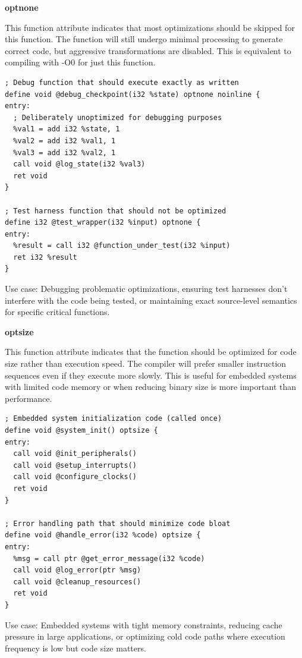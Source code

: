 \textbf{optnone}

This function attribute indicates that most optimizations should be skipped for this function.
The function will still undergo minimal processing to generate correct code, but aggressive transformations are disabled.
This is equivalent to compiling with -O0 for just this function.

\begin{lstlisting}[style=ir]
; Debug function that should execute exactly as written
define void @debug_checkpoint(i32 %state) optnone noinline {
entry:
  ; Deliberately unoptimized for debugging purposes
  %val1 = add i32 %state, 1
  %val2 = add i32 %val1, 1
  %val3 = add i32 %val2, 1
  call void @log_state(i32 %val3)
  ret void
}

; Test harness function that should not be optimized
define i32 @test_wrapper(i32 %input) optnone {
entry:
  %result = call i32 @function_under_test(i32 %input)
  ret i32 %result
}
\end{lstlisting}

Use case: Debugging problematic optimizations, ensuring test harnesses don't interfere with the code being tested, or maintaining exact source-level semantics for specific critical functions.

\textbf{optsize}

This function attribute indicates that the function should be optimized for code size rather than execution speed.
The compiler will prefer smaller instruction sequences even if they execute more slowly.
This is useful for embedded systems with limited code memory or when reducing binary size is more important than performance.

\begin{lstlisting}[style=ir]
; Embedded system initialization code (called once)
define void @system_init() optsize {
entry:
  call void @init_peripherals()
  call void @setup_interrupts()
  call void @configure_clocks()
  ret void
}

; Error handling path that should minimize code bloat
define void @handle_error(i32 %code) optsize {
entry:
  %msg = call ptr @get_error_message(i32 %code)
  call void @log_error(ptr %msg)
  call void @cleanup_resources()
  ret void
}
\end{lstlisting}

Use case: Embedded systems with tight memory constraints, reducing cache pressure in large applications, or optimizing cold code paths where execution frequency is low but code size matters.

